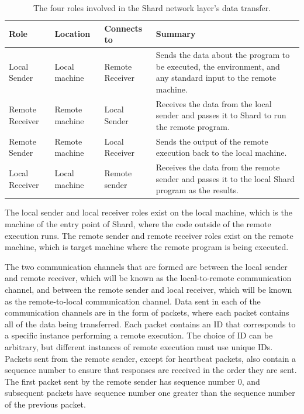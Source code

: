\documentclass[twoside]{report}
\begin{document}
\begin{table}
  \begin{center}
    \begin{tabularx}{\textwidth}{|l|l|l|X|}
      \hline
      Role            & Location       & Connects to     & Summary                                                                                                         \\ \hline
      Local Sender    & Local machine  & Remote Receiver & Sends the data about the program to be executed, the environment, and any standard input to the remote machine.
      \\ \hline
      Remote Receiver & Remote machine & Local Sender    & Receives the data from the local sender and passes it to Shard to run the remote program.
      \\ \hline
      Remote Sender   & Remote machine & Local Receiver  & Sends the output of the remote execution back to the local machine.
      \\ \hline
      Local Receiver  & Local machine  & Remote sender   & Receives the data from the remote sender and passes it to the local Shard program as the results.
      \\ \hline
    \end{tabularx}
    \caption{The four roles involved in the Shard network layer's data transfer.}
    \label{fig:roles_design}
  \end{center}
\end{table}

The local sender and local receiver roles exist on the local machine, which is the machine of the entry point of Shard, where the code outside of the remote execution runs.
The remote sender and remote receiver roles exist on the remote machine, which is target machine where the remote program is being executed.

The two communication channels that are formed are between the local sender and remote receiver, which will be known as the local-to-remote communication channel, and between the remote sender and local receiver, which will be known as the remote-to-local communication channel.
Data sent in each of the communication channels are in the form of packets, where each packet contains all of the data being transferred.
Each packet contains an ID that corresponds to a specific instance performing a remote execution.
The choice of ID can be arbitrary, but different instances of remote execution must use unique IDs.
Packets sent from the remote sender, except for heartbeat packets, also contain a sequence number to ensure that responses are received in the order they are sent.
The first packet sent by the remote sender has sequence number 0, and subsequent packets have sequence number one greater than the sequence number of the previous packet.
\end{document}
